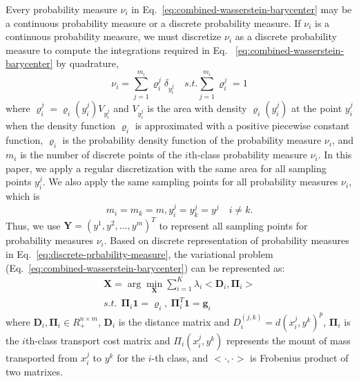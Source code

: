 Every probability measure $\nu_i$ in Eq.~\ref{eq:combined-wasserstein-barycenter} may be a continuous probability measure or a discrete probability measure.
If $\nu_i$ is a continuous probability measure,
we must discretize  $\nu_i$ as a discrete probability measure
to compute the integrations required in Eq. ~\ref{eq:combined-wasserstein-barycenter} by quadrature,
\begin{equation}\label{eq:discrete-prbability-measure}
\nu_i=\sum\limits_{j=1}^{m_i}\varrho_i^j\delta_{y_i^j} \quad s.t. \sum\limits_{j=1}^{m_i}\varrho_i^j=1
\end{equation}
where $\varrho_i^j=\varrho_i(y_i^j)V_{y_i^j}$
and $V_{y_i^j}$ is the area with density $\varrho_i(y_i^j)$ at the point $y_i^j$ when the density function
$\varrho_i$ is approximated with a positive piecewise constant function,
$\varrho_i$ is the probability density function of the probability measure $\nu_i$,
and $m_i$ is the number of discrete points of the $i$th-class probability measure $\nu_i$.
In this paper,
we apply a regular discretization with the same area for all sampling points $y_i^j$.
We also apply the same sampling points for all probability measures $\nu_i$,
which is
\begin{equation*}
m_i=m_k=m, y_i^j=y_k^j=y^j \quad{i\neq k}.
\end{equation*}
Thus, we use $\mathbf{Y}=(y^1,y^2,...,y^m)^T$ to represent all sampling points for probability measures $\nu_i$.
Based on discrete representation of probability measures in Eq.~\ref{eq:discrete-prbability-measure},
the variational problem (Eq.~\ref{eq:combined-wasserstein-barycenter}) can be represented as:
\begin{equation}\label{eq:discrete-multi-problem}
  \begin{aligned}
  \mathbf{X}=\arg\min\limits_{\mathbf{X}}\sum\limits_{i=1}^K\lambda_i<\mathbf{D}_i,\mathbf{\Pi}_i> \\
    s.t.\ \ \mathbf{\Pi}_i\mathbf{1}=\mathbf{\varrho}_i,\ \mathbf{\Pi}_i^T\mathbf{1}=\mathbf{g}_i
  \end{aligned}
\end{equation}
where
 $\mathbf{D}_i,\mathbf{\Pi}_i\in R_+^{n\times m}$,
 $\mathbf{D}_i$ is the distance matrix and $D_i^{(j,k)}=d(x_i^j,y^k)^p$,
 $\mathbf{\Pi}_i$ is the $i$th-class transport cost matrix and $\Pi_i(x_i^j,y^k)$ represents the mount of mass transported from $x_i^j$ to $y^k$ for the $i$-th class,
 and $<\cdot,\cdot>$ is Frobenius product of two matrixes.

